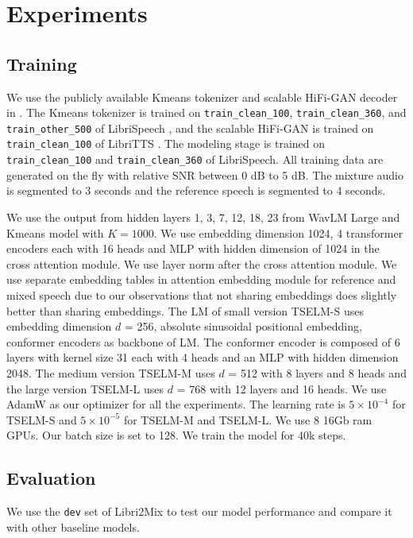 \documentclass[conference]{IEEEtran}
\begin{document}
\section{Experiments}




\subsection{Training}

We use the publicly available Kmeans tokenizer and scalable 
HiFi-GAN decoder in \cite{speechbrain}. The Kmeans tokenizer
is trained on \texttt{train\_clean\_100}, \texttt{train\_clean\_360}, and \texttt{train\_other\_500} of
LibriSpeech \cite{librispeech}, and the scalable HiFi-GAN is trained on \texttt{train\_clean\_100} of 
LibriTTS \cite{libritts}. The modeling stage is trained on 
\texttt{train\_clean\_100} and \texttt{train\_clean\_360} of LibriSpeech. All training data are 
generated on the fly with relative SNR between 0 dB to 5 dB. The mixture audio is segmented to 3 
seconds and the reference speech is segmented to 4 seconds. 

We use the output from hidden layers 1, 3, 7, 12, 18, 23 from WavLM Large and Kmeans model with 
\(K=1000\).
We use embedding dimension 1024,  4 transformer 
encoders each with 16 heads and MLP with hidden dimension of 1024 in the cross attention module. We 
use layer norm after the cross attention module. 
We use separate embedding tables in attention embedding module for reference and mixed speech due to our observations that not 
sharing embeddings does slightly better than sharing embeddings. The LM of small version TSELM-S uses 
embedding dimension \(d\) = 256, absolute sinusoidal positional embedding, conformer encoders as backbone of LM. The conformer encoder is composed of 
6 layers with kernel size 31 each with 4 heads and an MLP with hidden dimension 2048. The medium version TSELM-M uses \(d\) = 512 with 8 layers and 8 heads and the large version TSELM-L uses 
\(d\) = 768 with 12 layers and 16 heads. We use AdamW as 
our optimizer for all the experiments. The learning rate 
is \(5 \times 10^{-4}\) for TSELM-S and \(5 \times 10^{-5}\) for TSELM-M and TSELM-L. We use 8 16Gb ram GPUs. Our batch size is set to 128. We train the model for 40k steps. 


\subsection{Evaluation}
We use the \texttt{dev} set of Libri2Mix \cite{librimix} to test our model performance and compare it with 
other baseline models. 
\end{document}

